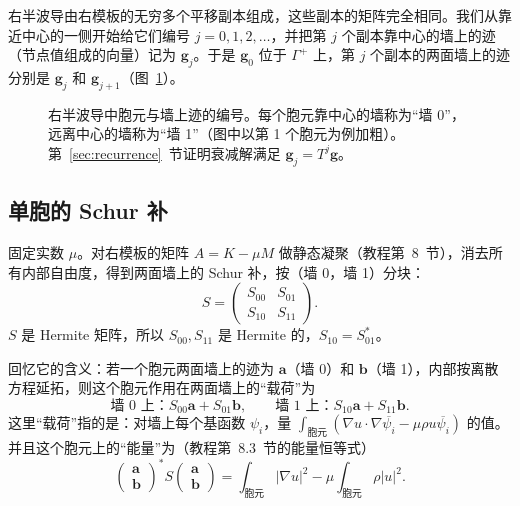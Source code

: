 \documentclass[11pt,a4paper,fontset=fandol]{ctexart}
\begin{document}
右半波导由右模板的无穷多个平移副本组成，这些副本的矩阵完全相同。我们从靠近中心的一侧开始给它们编号 $j=0,1,2,\dots$，并把第 $j$ 个副本靠中心的墙上的迹（节点值组成的向量）记为 $\bm g_j$。于是 $\bm g_0$ 位于 $\Gamma^+$ 上，第 $j$ 个副本的两面墙上的迹分别是 $\bm g_j$ 和 $\bm g_{j+1}$（图~\ref{fig:cells}）。

\begin{figure}[ht]
\centering
{}
\caption{右半波导中胞元与墙上迹的编号。每个胞元靠中心的墙称为“墙 0”，远离中心的墙称为“墙 1”（图中以第 1 个胞元为例加粗）。第~\ref{sec:recurrence}~节证明衰减解满足 $\bm g_j=T^j\bm g$。}
\label{fig:cells}
\end{figure}

\subsection{单胞的 Schur 补}

固定实数 $\mu$。对右模板的矩阵 $A=K-\mu M$ 做静态凝聚（教程第~8~节），消去所有内部自由度，得到两面墙上的 Schur 补，按（墙 0，墙 1）分块：
\[
S=\begin{pmatrix}S_{00}&S_{01}\\ S_{10}&S_{11}\end{pmatrix}.
\]
$S$ 是 Hermite 矩阵，所以 $S_{00},S_{11}$ 是 Hermite 的，$S_{10}=S_{01}^*$。

回忆它的含义：若一个胞元两面墙上的迹为 $\bm a$（墙 0）和 $\bm b$（墙 1），内部按离散方程延拓，则这个胞元作用在两面墙上的“载荷”为
\[
\text{墙 0 上：}S_{00}\bm a+S_{01}\bm b,\qquad \text{墙 1 上：}S_{10}\bm a+S_{11}\bm b .
\]
这里“载荷”指的是：对墙上每个基函数 $\psi_i$，量 $\int_{\text{胞元}}(\nabla u\cdot\nabla\overline{\psi_i}-\mu\rho u\overline{\psi_i})$ 的值。并且这个胞元上的“能量”为（教程第~8.3~节的能量恒等式）
\begin{equation}
\label{eq:cell-energy}
\begin{pmatrix}\bm a\\ \bm b\end{pmatrix}^{\!*}S\begin{pmatrix}\bm a\\ \bm b\end{pmatrix}=\int_{\text{胞元}}|\nabla u|^2-\mu\int_{\text{胞元}}\rho|u|^2 .
\end{equation}
\end{document}
